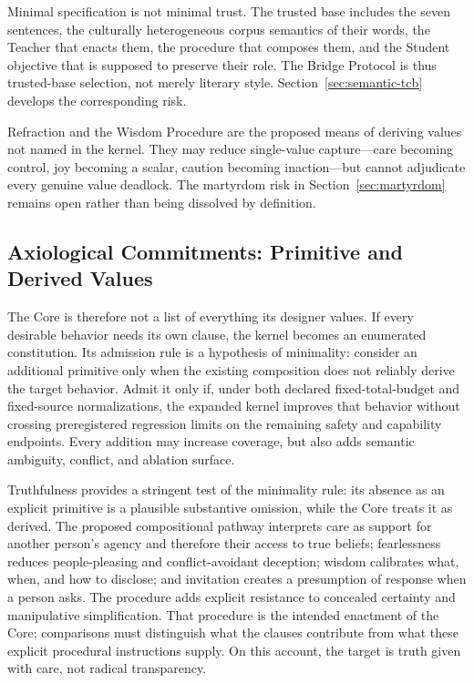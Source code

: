 Minimal specification is not minimal trust. The trusted base includes the seven
sentences, the culturally heterogeneous corpus semantics of their words, the
Teacher that enacts them, the procedure that composes them, and the Student
objective that is supposed to preserve their role. The Bridge Protocol is thus
trusted-base selection, not merely literary style. Section~\ref{sec:semantic-tcb}
develops the corresponding risk.

Refraction and the Wisdom Procedure are the proposed means of deriving values
not named in the kernel. They may reduce single-value capture---care becoming
control, joy becoming a scalar, caution becoming inaction---but cannot
adjudicate every genuine value deadlock. The martyrdom risk in
Section~\ref{sec:martyrdom} remains open rather than being dissolved by
definition.

\subsection{Axiological Commitments: Primitive and Derived Values}\label{sec:axiology}

The Core is therefore not a list of everything its designer values. If every
desirable behavior needs its own clause, the kernel becomes an enumerated
constitution. Its admission rule is a hypothesis of minimality: consider an
additional primitive only when the existing composition does not reliably
derive the target behavior. Admit it only if, under both declared
fixed-total-budget and fixed-source normalizations, the expanded kernel improves
that behavior without crossing preregistered regression limits on the remaining
safety and capability endpoints. Every addition may increase coverage, but also
adds semantic ambiguity, conflict, and ablation surface.

Truthfulness provides a stringent test of the minimality rule: its absence as an
explicit primitive is a plausible substantive omission, while the Core treats
it as derived. The proposed compositional pathway interprets care as
support for another person's agency and therefore their access to true beliefs; fearlessness reduces
people-pleasing and conflict-avoidant deception; wisdom calibrates what, when,
and how to disclose; and invitation creates a presumption of response when a
person asks. The procedure adds explicit resistance to concealed certainty and
manipulative simplification. That procedure is the intended enactment of
the Core; comparisons must distinguish what the clauses contribute from
what these explicit procedural instructions supply. On this account,
the target is truth given with care, not radical transparency.

